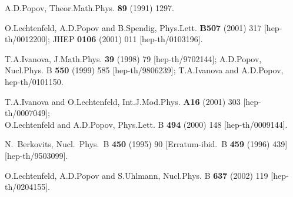 \documentclass[a4paper,11pt]{article}
\numberwithin{equation}{section}
\begin{document}
\begin{thebibliography}{99}
A.D.Popov,
Theor.Math.Phys.  {\bf 89} (1991) 1297.

O.Lechtenfeld, A.D.Popov and B.Spendig,
Phys.Lett. {\bf B507} (2001) 317  [hep-th/0012200];
JHEP {\bf 0106} (2001) 011 [hep-th/0103196].

T.A.Ivanova, 
J.Math.Phys. {\bf 39} (1998) 79 [hep-th/9702144];
A.D.Popov,
Nucl.Phys. B {\bf 550} (1999) 585
[hep-th/9806239];
T.A.Ivanova and A.D.Popov,
hep-th/0101150.

T.A.Ivanova and O.Lechtenfeld,
Int.J.Mod.Phys. {\bf A16} (2001) 303  [hep-th/0007049];
\\
O.Lechtenfeld and A.D.Popov,
Phys.Lett. B {\bf 494} (2000) 148
[hep-th/0009144].


N.~Berkovits,
Nucl.\ Phys.\ B {\bf 450} (1995) 90
[Erratum-ibid.\ B {\bf 459} (1996) 439]
[hep-th/9503099].



O.Lechtenfeld, A.D.Popov and S.Uhlmann,
Nucl.Phys. B {\bf 637} (2002) 119
[hep-th/0204155].

\end{thebibliography}
\end{document}
